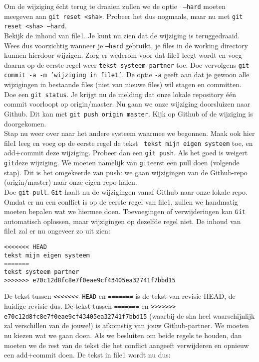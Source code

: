 \step Om de wijziging écht terug te draaien zullen we de optie {\tt
  --hard} moeten meegeven aan {\tt git reset <sha>}. Probeer het dus
nogmaals, maar nu met {\tt git reset <sha> --hard}. \\

\step Bekijk de inhoud van file1. Je kunt nu zien dat de wijziging is
teruggedraaid. Wees dus voorzichtig wanneer je {\tt --hard} gebruikt,
je files in de working directory kunnen hierdoor wijzigen. Zorg er
wederom voor dat file1 leegt wordt en voeg daarna op de eerste regel
weer {\tt tekst systeem partner} toe. Doe vervolgens {\tt git commit -a -m
  'wijziging in file1'}. De optie {\tt -a} geeft aan dat je gewoon
alle wijzigingen in bestaande files (niet van nieuwe files) wil stagen
en committen. \\ 

\step Doe een {\tt git status}. Je krijgt nu de melding dat onze
lokale repository één commit voorloopt op origin/master. Nu gaan we
onze wijziging doorsluizen naar Github. Dit kan met {\tt git
  push origin master}. Kijk op Github of de wijziging is doorgekomen. \\

\step Stap nu weer over naar het andere systeem waarmee we begonnen.
Maak ook hier file1 leeg en voeg op de eerste regel de tekst {\tt
  tekst mijn eigen systeem} toe, en add+commit deze wijziging. Probeer dan
een {\tt git push}. Als het goed is weigert {\tt git}deze wijziging. We
moeten namelijk van {\tt git}eerst een pull doen (volgende stap). Dit is het omgekeerde van
push: we gaan wijzigingen van de Github-repo (origin/master) naar onze
eigen repo halen. \\

\step Doe {\tt git pull}. {\tt Git} haalt nu de wijzigingen vanaf Github
naar onze lokale repo. Omdat er nu een conflict is op de eerste regel
van file1, zullen we handmatig moeten bepalen wat we hiermee doen.
Toevoegingen of verwijderingen kan {\tt Git} automatisch oplossen, maar
wijzigingen op dezelfde regel niet. De inhoud
van file1 zal er nu ongeveer zo uit zien:

\begin{verbatim}
<<<<<<< HEAD
tekst mijn eigen systeem
=======
tekst systeem partner
>>>>>>> e70c12d8fc8e7f0eae9cf43405ea32741f7bbd15
\end{verbatim}

De tekst tussen {\tt <<<<<<< HEAD} en {\tt =======} is de tekst van
revisie HEAD, de huidige revisie dus. De tekst tussen {\tt =======} en
{\tt >>>>>>> e70c12d8fc8e7f0eae9cf43405ea32741f7bbd15} (waarbij de sha
heel waarschijnlijk zal verschillen van de jouwe!) is afkomstig van
jouw Github-partner. We moeten nu kiezen wat we gaan doen.
Als we besluiten om beide regels te houden, dan moeten we de rest van
de tekst die het conflict aangeeft verwijderen en opnieuw een
add+commit doen. De tekst in file1 wordt nu dus: 

